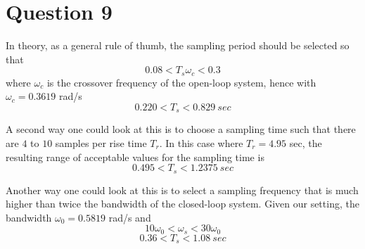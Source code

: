 \section{Question 9}

In theory\cite{levine}, as a general rule of thumb, the sampling period should
be selected so that $$0.08 < T_s \omega_c < 0.3$$ where $\omega_c$ is the
crossover frequency of the open-loop system, hence with $\omega_c = 0.3619$
rad/s $$0.220 < T_s < 0.829\ sec$$

A second way one could look at this is to choose a sampling time such that there
are $4$ to $10$ samples per rise time $T_r$. In this case where $T_r=4.95$ sec,
the resulting range of acceptable values for the sampling time is
$$0.495 < T_s < 1.2375\ sec$$

Another way one could look at this is to select a sampling frequency that is
much higher than twice the bandwidth of the closed-loop system. Given our
setting, the bandwidth $\omega_0 = 0.5819$ rad/s and
$$10\omega_0 < \omega_s < 30\omega_0$$
$$0.36 < T_s < 1.08\ sec$$
